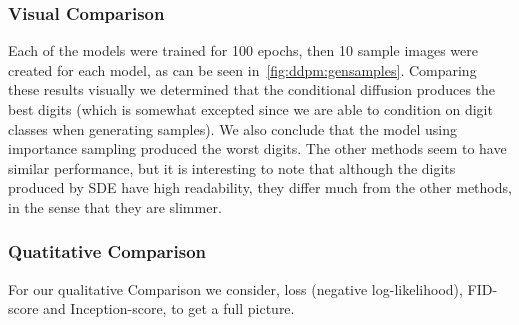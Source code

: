 \subsubsection{Visual Comparison}
Each of the models were trained for 100 epochs, then 10 sample images were created for each model, as can be seen in~\cref{fig:ddpm:gensamples}.
Comparing these results visually we determined that the conditional diffusion produces the best digits (which is somewhat excepted since we are able to condition on digit classes when generating samples).
We also conclude that the model using importance sampling produced the worst digits. 
The other methods seem to have similar performance, but it is interesting to note that although the digits produced by SDE have high readability, they differ much from the other methods, in the sense that they are slimmer.


\subsubsection{Quatitative Comparison}
For our qualitative Comparison we consider, loss (negative log-likelihood), FID-score and Inception-score, to get a full picture.

